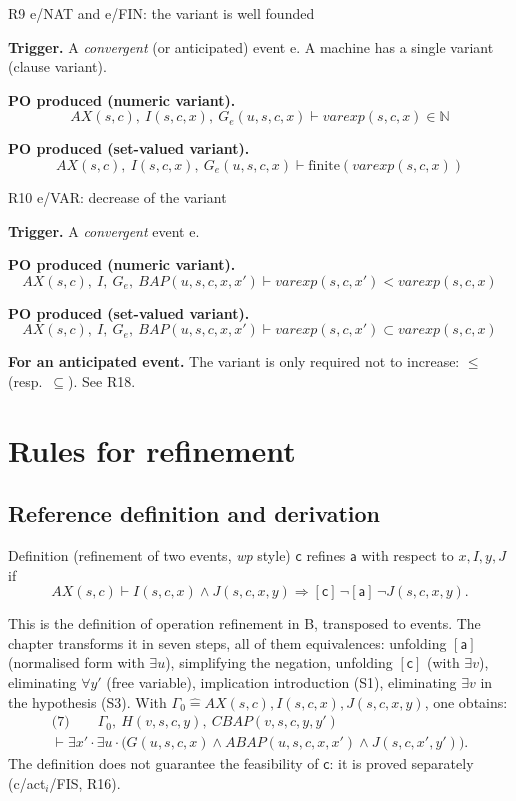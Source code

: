 \documentclass[11pt,a4paper]{article}
\newcommand{\limp}{\Rightarrow}
\newcommand{\nat}{\mathbb{N}}
\newcommand{\AX}{\mathit{AX}(s,c)}
\newcommand{\sff}[1]{\textsf{#1}}
\newcommand{\po}[1]{\textsf{\small #1}}
\newcommand{\champ}[1]{\par\smallskip\noindent\textbf{#1}\enspace}
\begin{document}
\begin{regle}{R9 \quad \po{e/NAT} and \po{e/FIN}: the variant is well founded}
  \champ{Trigger.} A \emph{convergent} (or anticipated) event \sff{e}. A machine has
  a single variant (clause \sff{variant}).
  \champ{PO produced (numeric variant).}
  \[ \AX,\ I(s,c,x),\ G_e(u,s,c,x) \vdash \mathit{varexp}(s,c,x)\in\nat \]
  \champ{PO produced (set-valued variant).}
  \[ \AX,\ I(s,c,x),\ G_e(u,s,c,x) \vdash \mathrm{finite}(\mathit{varexp}(s,c,x)) \]
\end{regle}

\begin{regle}{R10 \quad \po{e/VAR}: decrease of the variant}
  \champ{Trigger.} A \emph{convergent} event \sff{e}.
  \champ{PO produced (numeric variant).}
  \[ \AX,\ I,\ G_e,\ \mathit{BAP}(u,s,c,x,x') \vdash \mathit{varexp}(s,c,x') < \mathit{varexp}(s,c,x) \]
  \champ{PO produced (set-valued variant).}
  \[ \AX,\ I,\ G_e,\ \mathit{BAP}(u,s,c,x,x') \vdash \mathit{varexp}(s,c,x') \subset \mathit{varexp}(s,c,x) \]
  \champ{For an anticipated event.} The variant is only required not to increase:
  $\le$ (resp.\ $\subseteq$). See R18.
\end{regle}

\section{Rules for refinement}

\subsection{Reference definition and derivation}\label{sec:defraf}
\begin{regle}{Definition (refinement of two events, \emph{wp} style)}
  $\mathsf{c}$ refines $\mathsf{a}$ with respect to $x, I, y, J$ if
  \[ \AX \vdash I(s,c,x)\wedge J(s,c,x,y) \limp [\mathsf{c}]\,\neg[\mathsf{a}]\,\neg J(s,c,x,y). \]
\end{regle}
This is the definition of operation refinement in B, transposed to events. The
chapter transforms it in seven steps, all of them equivalences: unfolding
$[\mathsf{a}]$ (normalised form with $\exists u$), simplifying the negation,
unfolding $[\mathsf{c}]$ (with $\exists v$), eliminating $\forall y'$ (free
variable), implication introduction (S1), eliminating $\exists v$ in the hypothesis
(S3). With $\Gamma_0 \widehat{=} \AX, I(s,c,x), J(s,c,x,y)$, one obtains:
\begin{multline*}
  \text{(7)}\qquad \Gamma_0,\ H(v,s,c,y),\ \mathit{CBAP}(v,s,c,y,y') \\
  \vdash \exists x'\cdot\exists u\cdot\big(G(u,s,c,x)\wedge\mathit{ABAP}(u,s,c,x,x')\wedge J(s,c,x',y')\big).
\end{multline*}
The definition does not guarantee the feasibility of $\mathsf{c}$: it is proved
separately (\po{c/act$_i$/FIS}, R16).
\end{document}
